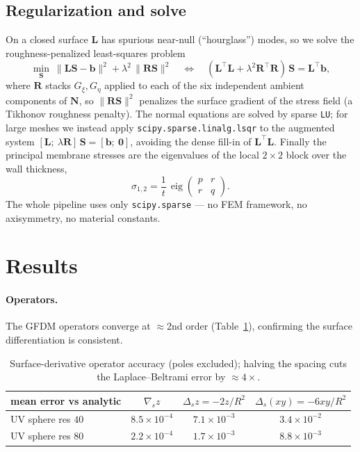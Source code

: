 \documentclass[11pt]{article}
\newcommand{\vv}[1]{\bm{#1}}
\newcommand{\NN}{\mathbf{N}}
\begin{document}
\subsection{Regularization and solve}
On a closed surface $\mathbf L$ has spurious near-null (``hourglass'') modes, so we solve the
roughness-penalized least-squares problem
\begin{equation}
  \min_{\vv S}\ \|\mathbf L\vv S-\vv b\|^2 + \lambda^2\,\|\mathbf R\vv S\|^2
  \quad\Longleftrightarrow\quad
  (\mathbf L^{\!\top}\mathbf L+\lambda^2\mathbf R^{\!\top}\mathbf R)\,\vv S=\mathbf L^{\!\top}\vv b,
  \label{eq:tikhonov}
\end{equation}
where $\mathbf R$ stacks $G_\xi,G_\eta$ applied to each of the six independent ambient
components of $\NN$, so $\|\mathbf R\vv S\|^2$ penalizes the surface gradient of the stress
field (a Tikhonov roughness penalty). The normal equations are solved by sparse \texttt{LU};
for large meshes we instead apply \texttt{scipy.sparse.linalg.lsqr} to the augmented system
$[\mathbf L;\ \lambda\mathbf R]\,\vv S=[\vv b;\ \vv0]$, avoiding the dense fill-in of
$\mathbf L^{\!\top}\mathbf L$. Finally the principal membrane stresses are the eigenvalues of
the local $2\times2$ block over the wall thickness,
\begin{equation}
  \sigma_{1,2}=\frac1t\,\operatorname{eig}\!\begin{pmatrix}p&r\\ r&q\end{pmatrix}.
\end{equation}
The whole pipeline uses only \texttt{scipy.sparse} --- no FEM framework, no axisymmetry, no
material constants.

\section{Results}\label{sec:results}

\paragraph{Operators.} The GFDM operators converge at $\approx$2nd order
(Table~\ref{tab:ops}), confirming the surface differentiation is consistent.

\begin{table}[h]\centering
\begin{tabular}{lccc}
\toprule
mean error vs analytic & $\nabla_s z$ & $\Delta_s z=-2z/R^2$ & $\Delta_s(xy)=-6xy/R^2$ \\
\midrule
UV sphere res $40$ & $8.5\times10^{-4}$ & $7.1\times10^{-3}$ & $3.4\times10^{-2}$ \\
UV sphere res $80$ & $2.2\times10^{-4}$ & $1.7\times10^{-3}$ & $8.8\times10^{-3}$ \\
\bottomrule
\end{tabular}
\caption{Surface-derivative operator accuracy (poles excluded); halving the spacing cuts
the Laplace--Beltrami error by $\approx4\times$.}
\label{tab:ops}
\end{table}
\end{document}
